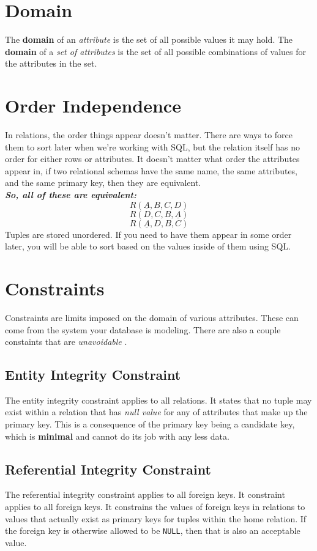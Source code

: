 \documentclass{report}
\begin{document}
\section{Domain}
The \textbf{domain} of an \textit{attribute} is the set of all possible values it may hold.
The \textbf{domain} of a \textit{set of attributes} is the set of all possible combinations of values for the attributes in the set.
\section{Order Independence}
In relations, the order things appear doesn't matter. There are ways to force them to sort later when we're working with SQL, but the relation itself has no order for either rows or attributes.
\bigbreak \noindent
It doesn't matter what order the attributes appear in, if two relational schemas have the same name, the same attributes, and the same primary key, then they are equivalent. \\
\textit{\textbf{So, all of these are equivalent:}}
$$ R(\underline{A},B,C,D)$$
$$ R(D,C,B,\underline{A})$$
$$ R(\underline{A},D,B,C)$$
Tuples are stored unordered. If you need to have them appear in some order later, you will be able to sort based on the values inside of them using SQL.
    \section{Constraints}
    Constraints are limits imposed on the domain of various attributes. These can come from the system your database is modeling.
    \bigbreak \noindent
    There are also a couple constaints that are \textit{unavoidable }.
    \subsection*{Entity Integrity Constraint}
    The entity integrity constraint applies to all relations. It states that no tuple may exist within a relation that has \textit{null value} for any of attributes that make up the primary key. This is a consequence of the primary key being a candidate key, which is \textbf{minimal} and cannot do its job with any less data.
    \subsection*{Referential Integrity Constraint}
    The referential integrity constraint applies to all foreign keys. It constraint applies to all foreign keys. It constrains the values of foreign keys in relations to values that actually exist as primary keys for tuples within  the home relation. If the foreign key is otherwise allowed to be \texttt{NULL}, then that is also an acceptable value.
\end{document}
